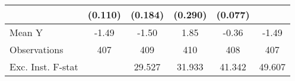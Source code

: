 {\begin{tabular}{l*{5}{c}}
            &     (0.110)         &     (0.184)         &     (0.290)         &     (0.077)         &                     \\
\midrule
Mean Y      &       -1.49         &       -1.50         &        1.85         &       -0.36         &       -1.49         \\
Observations&         407         &         409         &         410         &         408         &         407         \\
Exc. Inst. F-stat&                     &      29.527         &      31.933         &      41.342         &      49.607         \\
\bottomrule
\end{tabular}
}
